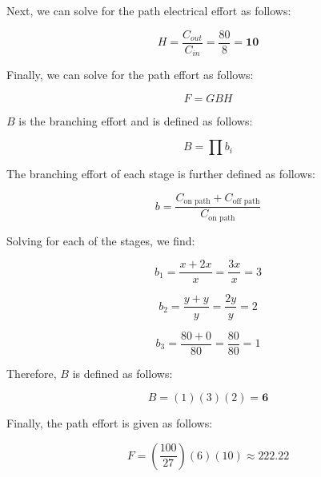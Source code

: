 \documentclass[fleqn]{article}
\begin{document}
\begin{enumerate}
\begin{enumerate}
				Next, we can solve for the path electrical effort as follows:
				
				\begin{equation*}
					H = \frac{C_{out}}{C_{in}} = \frac{80}{8} = \mathbf{10}
				\end{equation*}
				
				Finally, we can solve for the path effort as follows:
				
				\begin{equation*}
					F = GBH
				\end{equation*}
				
				$B$ is the branching effort and is defined as follows:
				
				\begin{equation*}
					B = \prod{b_i}
				\end{equation*}
				
				The branching effort of each stage is further defined as follows:
				
				\begin{equation*}
					b = \frac{C_{\text{on path}} + C_{\text{off path}}}{C_\text{on path}}
				\end{equation*}
				
				Solving for each of the stages, we find:
				
				\begin{equation*}
					b_1 = \frac{x + 2x}{x} = \frac{3x}{x} = 3
				\end{equation*}
				
				\begin{equation*}
					b_2 = \frac{y + y}{y} = \frac{2y}{y} = 2
				\end{equation*}
				
				\begin{equation*}
					b_3 = \frac{80 + 0}{80} = \frac{80}{80} = 1
				\end{equation*}
				
				Therefore, $B$ is defined as follows:
				
				\begin{equation*}
					B = (1)(3)(2) = \mathbf{6}
				\end{equation*}
				
				Finally, the path effort is given as follows:
				
				\begin{equation*}
					F = \left(\frac{100}{27}\right)\left(6\right)\left(10\right) \approx \mathbf{222.22}
				\end{equation*}
				

\end{enumerate}
\end{enumerate}
\end{document}
